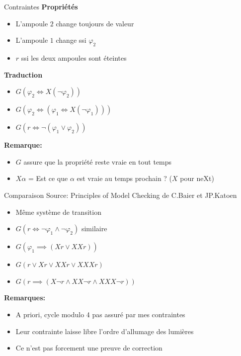 \documentclass{beamer}
\theoremstyle{definition}
\begin{document}
\begin{frame}{Contraintes}
    \textbf{Propriétés}
    \begin{itemize}
        \item L'ampoule $2$ change toujours de valeur
        \item L'ampoule $1$ change ssi $\varphi_2$
        \item $r$ ssi les deux ampoules sont éteintes
    \end{itemize}
    \pause
    \textbf{Traduction}
    \begin{itemize}
        \item $G(\varphi_2 \Leftrightarrow X(\lnot\varphi_2))$
        \item $G(\varphi_2\Leftrightarrow(\varphi_1 \Leftrightarrow X(\lnot\varphi_1)))$
        \item $G(r \Leftrightarrow \lnot(\varphi_1\lor\varphi_2))$
    \end{itemize}
    \pause
    \textbf{Remarque: } 
    \begin{itemize}
        \item $G$ assure que la propriété reste vraie en tout temps
        \item $X\alpha$ = Est ce que $\alpha$ est vraie au temps prochain ? ($X$ pour neXt)
    \end{itemize}
\end{frame}

\begin{frame}{Comparaison}
    Source: Principles of Model Checking de C.Baier et JP.Katoen
    \begin{itemize}
        \item Même système de transition
        \item $G(r\Leftrightarrow\lnot\varphi_1\land\lnot\varphi_2)$ similaire
        \item $G(\varphi_1 \implies(Xr \lor XXr))$
        \item $G(r\lor Xr\lor XXr \lor XXXr)$
        \item $G(r\implies(X\lnot r \land XX\lnot r \land XXX \lnot r))$
    \end{itemize}
    
    \pause
    \textbf{Remarques:}
    \begin{itemize}
        \item A priori, cycle modulo 4 pas assuré par mes contraintes
        \item Leur contrainte laisse libre l'ordre d'allumage des lumières
        \item Ce n'est pas forcement une preuve de correction
    \end{itemize}
\end{frame}
\end{document}
